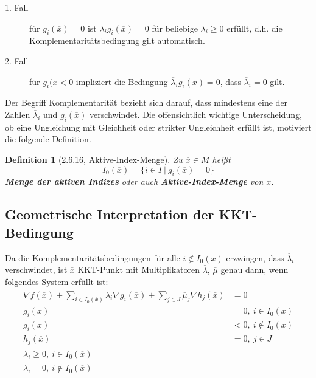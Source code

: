 \documentclass[12pt]{extreport} %
\theoremstyle{named}
\theoremstyle{nnamed}
\theoremstyle{itshape}
\newtheorem*{definition}{Definition}
\theoremstyle{normal}
\begin{document}
\begin{description}
	\item[1. Fall] für $g_i(\overline{x}) = 0$ ist $\overline{\lambda}_i g_i(\overline{x}) = 0$ für beliebige $\overline{\lambda}_i \geq 0$ erfüllt, d.h. die Komplementaritätsbedingung gilt automatisch.
	\item[2. Fall] für $g_i(\overline{x} < 0$ impliziert die Bedingung $\overline{\lambda}_i g_i(\overline{x}) = 0$, dass $\overline{\lambda}_i = 0$ gilt.
\end{description}	

Der Begriff Komplementarität bezieht sich darauf, dass mindestens eine der Zahlen $\overline{\lambda}_i$ und $g_i(\overline{x})$ verschwindet. Die offensichtlich wichtige Unterscheidung, ob eine Ungleichung mit Gleichheit oder strikter Ungleichheit erfüllt ist, motiviert die folgende Definition.

\begin{definition}[2.6.16, Aktive-Index-Menge]
	Zu $\overline{x} \in M$ heißt
	$$ I_0(\overline{x}) = \big\{ i \in I ~|~g_i(\overline{x}) = 0 \big\} $$	
	\textbf{Menge der aktiven Indizes} oder auch \textbf{Aktive-Index-Menge} von $\overline{x}$.
\end{definition}
	
\subsection*{Geometrische Interpretation der KKT-Bedingung}

Da die Komplementaritätsbedingungen für alle $i \notin I_0(\overline{x})$ erzwingen, dass $\overline{\lambda}_i$ verschwindet, ist $\overline{x}$ KKT-Punkt mit Multiplikatoren $\overline{\lambda}$, $\overline{\mu}$ genau dann, wenn folgendes System erfüllt ist:
	\begin{align*}
		\nabla f(\overline{x}) + \sum_{i \in I_0(\overline{x})} \overline{\lambda}_i \nabla g_i(\overline{x}) + \sum_{j \in J} \overline{\mu}_j \nabla h_j(\overline{x}) & = 0 \\
		g_i(\overline{x}) & = 0, ~i \in I_0(\overline{x}) \\
		g_i(\overline{x}) & < 0, ~i \notin I_0(\overline{x}) \\
		h_j(\overline{x}) & = 0, ~j \in J \\
		\overline{\lambda}_i \geq 0, ~i \in I_0(\overline{x}) \\
		\overline{\lambda}_i = 0, ~ i \notin I_0(\overline{x})
	\end{align*}	
	
\end{document}
